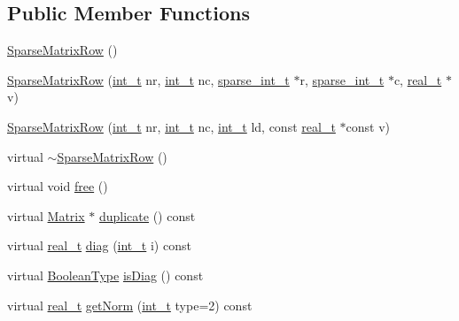 \subsection*{Public Member Functions}
\begin{DoxyCompactItemize}
\item 
\hyperlink{class_sparse_matrix_row_ad61dd7c9a0b5f00126f2c17cb325bfa4}{Sparse\+Matrix\+Row} ()
\item 
\hyperlink{class_sparse_matrix_row_a7a83a792ccf2cb68b0d660cad9f52322}{Sparse\+Matrix\+Row} (\hyperlink{_types_8hpp_ab6fd6105e64ed14a0c9281326f05e623}{int\+\_\+t} nr, \hyperlink{_types_8hpp_ab6fd6105e64ed14a0c9281326f05e623}{int\+\_\+t} nc, \hyperlink{_types_8hpp_aa5432b00c9081e2d62d7f38c32e4ed80}{sparse\+\_\+int\+\_\+t} $\ast$r, \hyperlink{_types_8hpp_aa5432b00c9081e2d62d7f38c32e4ed80}{sparse\+\_\+int\+\_\+t} $\ast$c, \hyperlink{qp_o_a_s_e_s__wrapper_8h_a0d00e2b3dfadee81331bbb39068570c4}{real\+\_\+t} $\ast$v)
\item 
\hyperlink{class_sparse_matrix_row_a998eef85d2cbe8d4c3856c043388c38d}{Sparse\+Matrix\+Row} (\hyperlink{_types_8hpp_ab6fd6105e64ed14a0c9281326f05e623}{int\+\_\+t} nr, \hyperlink{_types_8hpp_ab6fd6105e64ed14a0c9281326f05e623}{int\+\_\+t} nc, \hyperlink{_types_8hpp_ab6fd6105e64ed14a0c9281326f05e623}{int\+\_\+t} ld, const \hyperlink{qp_o_a_s_e_s__wrapper_8h_a0d00e2b3dfadee81331bbb39068570c4}{real\+\_\+t} $\ast$const v)
\item 
virtual \hyperlink{class_sparse_matrix_row_a40b6466c07a504d2232bac57b00338d5}{$\sim$\+Sparse\+Matrix\+Row} ()
\item 
virtual void \hyperlink{class_sparse_matrix_row_a5295955ae17b29db89b8fc2607bab8c8}{free} ()
\item 
virtual \hyperlink{class_matrix}{Matrix} $\ast$ \hyperlink{class_sparse_matrix_row_a2a74a4b97da1de2e8bd59ddd342afbba}{duplicate} () const
\item 
virtual \hyperlink{qp_o_a_s_e_s__wrapper_8h_a0d00e2b3dfadee81331bbb39068570c4}{real\+\_\+t} \hyperlink{class_sparse_matrix_row_a1a7b95bc5e229f7f295ddbe95f57f67f}{diag} (\hyperlink{_types_8hpp_ab6fd6105e64ed14a0c9281326f05e623}{int\+\_\+t} i) const
\item 
virtual \hyperlink{_types_8hpp_a20f82124c82b6f5686a7fce454ef9089}{Boolean\+Type} \hyperlink{class_sparse_matrix_row_a4e79919435999fbec85be5d9f66be503}{is\+Diag} () const
\item 
virtual \hyperlink{qp_o_a_s_e_s__wrapper_8h_a0d00e2b3dfadee81331bbb39068570c4}{real\+\_\+t} \hyperlink{class_sparse_matrix_row_a5300df119c3edc15b1e96fd57a4907ec}{get\+Norm} (\hyperlink{_types_8hpp_ab6fd6105e64ed14a0c9281326f05e623}{int\+\_\+t} type=2) const

\end{DoxyCompactItemize}
